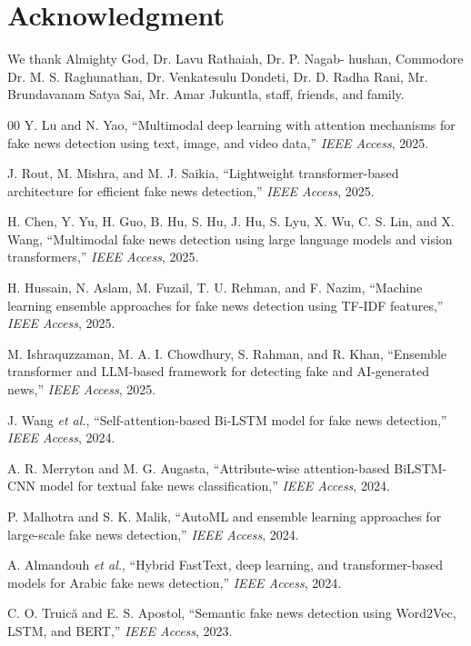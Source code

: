 \documentclass[conference]{IEEEtran}
\begin{document}
\section*{Acknowledgment}
We thank Almighty God, Dr. Lavu Rathaiah, Dr. P. Nagab-
hushan, Commodore Dr. M. S. Raghunathan, Dr. Venkatesulu
Dondeti, Dr. D. Radha Rani, Mr. Brundavanam Satya Sai, Mr. Amar
Jukuntla, staff, friends, and family.


\begin{thebibliography}{00}
Y. Lu and N. Yao, “Multimodal deep learning with attention mechanisms for fake news detection using text, image, and video data,” \textit{IEEE Access}, 2025.

J. Rout, M. Mishra, and M. J. Saikia, “Lightweight transformer-based architecture for efficient fake news detection,” \textit{IEEE Access}, 2025.

H. Chen, Y. Yu, H. Guo, B. Hu, S. Hu, J. Hu, S. Lyu, X. Wu, C. S. Lin, and X. Wang, “Multimodal fake news detection using large language models and vision transformers,” \textit{IEEE Access}, 2025.

H. Hussain, N. Aslam, M. Fuzail, T. U. Rehman, and F. Nazim, “Machine learning ensemble approaches for fake news detection using TF-IDF features,” \textit{IEEE Access}, 2025.

M. Ishraquzzaman, M. A. I. Chowdhury, S. Rahman, and R. Khan, “Ensemble transformer and LLM-based framework for detecting fake and AI-generated news,” \textit{IEEE Access}, 2025.

J. Wang \textit{et al.}, “Self-attention-based Bi-LSTM model for fake news detection,” \textit{IEEE Access}, 2024.

A. R. Merryton and M. G. Augasta, “Attribute-wise attention-based BiLSTM-CNN model for textual fake news classification,” \textit{IEEE Access}, 2024.

P. Malhotra and S. K. Malik, “AutoML and ensemble learning approaches for large-scale fake news detection,” \textit{IEEE Access}, 2024.

A. Almandouh \textit{et al.}, “Hybrid FastText, deep learning, and transformer-based models for Arabic fake news detection,” \textit{IEEE Access}, 2024.

C. O. Truică and E. S. Apostol, “Semantic fake news detection using Word2Vec, LSTM, and BERT,” \textit{IEEE Access}, 2023.


\end{thebibliography}
\end{document}

